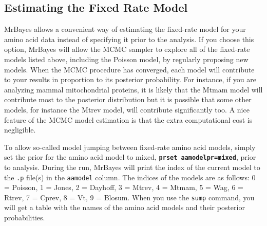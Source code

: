 \documentclass[12pt]{book}
\newcommand{\ttt}[1]{\texttt{#1}}
\newcommand{\tb}[1]{\ttt{\textbf{#1}}}
\begin{document}
\subsection{Estimating the Fixed Rate Model}
\label{estimatingTheFixedRateModel}
MrBayes allows a convenient way of estimating the fixed-rate model for your amino acid data instead
of specifying it prior to the analysis. If you choose this option, MrBayes will allow the MCMC
sampler to explore all of the fixed-rate models listed above, including the Poisson model, by
regularly proposing new models. When the MCMC procedure has converged, each model will contribute
to your results in proportion to its posterior probability. For instance, if you are analyzing
mammal mitochondrial proteins, it is likely that the Mtmam model will contribute most to the
posterior distribution but it is possible that some other models, for instance the Mtrev model,
will contribute significantly too. A nice feature of the MCMC model estimation is that the extra
computational cost is negligible.

To allow so-called model jumping between fixed-rate amino acid models, simply set the prior for the
amino acid model to mixed, \tb{prset aamodelpr=mixed}, prior to analysis. During the run, MrBayes
will print the index of the current model to the \ttt{.p} file(s) in the \ttt{aamodel} column. The
indices of the models are as follows: 0 = Poisson, 1 = Jones, 2 = Dayhoff, 3 = Mtrev, 4 = Mtmam, 5
= Wag, 6 = Rtrev, 7 = Cprev, 8 = Vt, 9 = Blosum. When you use the \ttt{sump} command, you will get
a table with the names of the amino acid models and their posterior probabilities.
\end{document}
